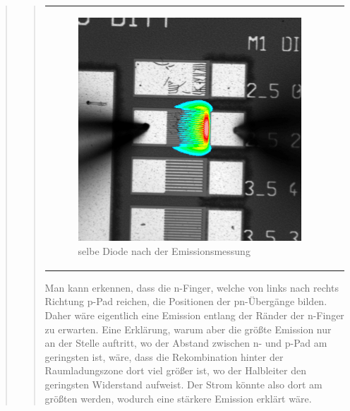 \begin{quote}
\begin{quote}
\begin{center}
\begin{tabular}{ll}
\begin{minipage}{0.6\textwidth}
                    \end{minipage}
                    \begin{minipage}{0.6\textwidth}

                         \begin{figure}[H]
                            \label{fig:zttrzttz}
                            \includegraphics[scale=0.25, trim = 0cm 0cm 0cm
                            0cm,
                            clip]{./Emissionsbilder/fuenf/SuperImpose.jpg}
                            \caption{selbe Diode nach der Emissionsmessung}
                        \end{figure}
                   \vspace{-1.5em}

                    \end{minipage}

                \end{tabular}
                \end{center}

        \vspace{2em}

        Man kann erkennen, dass die n-Finger, welche von links nach rechts
        Richtung p-Pad reichen, die Positionen der pn-Übergänge bilden. Daher
        wäre eigentlich eine Emission entlang der Ränder der n-Finger zu erwarten.
        Eine Erklärung, warum aber die größte Emission nur an der Stelle
        auftritt, wo der Abstand zwischen n- und p-Pad am geringsten ist, wäre, dass die
        Rekombination hinter der Raumladungszone dort viel größer ist, wo der
        Halbleiter den geringsten Widerstand aufweist. Der Strom könnte also
        dort am größten werden, wodurch eine stärkere Emission erklärt wäre.


\end{quote}
\end{quote}
